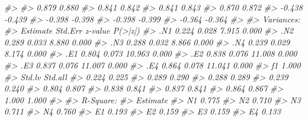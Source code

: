 \documentclass[
  11pt,
]{krantz}
\makeatletter
\newenvironment{Shaded}{\begin{snugshade}}{\end{snugshade}}
\newcommand{\CommentTok}[1]{\textcolor[rgb]{0.37,0.37,0.37}{\textit{#1}}}
\newenvironment{kframe}{%
\medskip{}
\setlength{\fboxsep}{.8em}
 \def\at@end@of@kframe{}%
 \ifinner\ifhmode%
  \def\at@end@of@kframe{\end{minipage}}%
  \begin{minipage}{\columnwidth}%
 \fi\fi%
 \def\FrameCommand##1{\hskip\@totalleftmargin \hskip-\fboxsep
 \colorbox{shadecolor}{##1}\hskip-\fboxsep
     \hskip-\linewidth \hskip-\@totalleftmargin \hskip\columnwidth}%
 \MakeFramed {\advance\hsize-\width
   \@totalleftmargin\z@ \linewidth\hsize
   \@setminipage}}%
 {\par\unskip\endMakeFramed%
 \at@end@of@kframe}
\renewenvironment{Shaded}{\begin{kframe}}{\end{kframe}}
\theoremstyle{definition}
\theoremstyle{definition}
\theoremstyle{definition}
\theoremstyle{definition}
\theoremstyle{remark}
\makeatother
\begin{document}
\begin{Shaded}
\begin{Highlighting}[]
\CommentTok{\#\textgreater{}                   }
\CommentTok{\#\textgreater{}     0.879    0.880}
\CommentTok{\#\textgreater{}     0.841    0.842}
\CommentTok{\#\textgreater{}     0.841    0.843}
\CommentTok{\#\textgreater{}     0.870    0.872}
\CommentTok{\#\textgreater{}    {-}0.438   {-}0.439}
\CommentTok{\#\textgreater{}    {-}0.398   {-}0.398}
\CommentTok{\#\textgreater{}    {-}0.398   {-}0.399}
\CommentTok{\#\textgreater{}    {-}0.364   {-}0.364}
\CommentTok{\#\textgreater{} }
\CommentTok{\#\textgreater{} Variances:}
\CommentTok{\#\textgreater{}                    Estimate  Std.Err  z{-}value  P(\textgreater{}|z|)}
\CommentTok{\#\textgreater{}    .N1                0.224    0.028    7.915    0.000}
\CommentTok{\#\textgreater{}    .N2                0.289    0.033    8.880    0.000}
\CommentTok{\#\textgreater{}    .N3                0.288    0.032    8.866    0.000}
\CommentTok{\#\textgreater{}    .N4                0.239    0.029    8.174    0.000}
\CommentTok{\#\textgreater{}    .E1                0.804    0.073   10.963    0.000}
\CommentTok{\#\textgreater{}    .E2                0.838    0.076   11.008    0.000}
\CommentTok{\#\textgreater{}    .E3                0.837    0.076   11.007    0.000}
\CommentTok{\#\textgreater{}    .E4                0.864    0.078   11.041    0.000}
\CommentTok{\#\textgreater{}     f1                1.000                           }
\CommentTok{\#\textgreater{}    Std.lv  Std.all}
\CommentTok{\#\textgreater{}     0.224    0.225}
\CommentTok{\#\textgreater{}     0.289    0.290}
\CommentTok{\#\textgreater{}     0.288    0.289}
\CommentTok{\#\textgreater{}     0.239    0.240}
\CommentTok{\#\textgreater{}     0.804    0.807}
\CommentTok{\#\textgreater{}     0.838    0.841}
\CommentTok{\#\textgreater{}     0.837    0.841}
\CommentTok{\#\textgreater{}     0.864    0.867}
\CommentTok{\#\textgreater{}     1.000    1.000}
\CommentTok{\#\textgreater{} }
\CommentTok{\#\textgreater{} R{-}Square:}
\CommentTok{\#\textgreater{}                    Estimate}
\CommentTok{\#\textgreater{}     N1                0.775}
\CommentTok{\#\textgreater{}     N2                0.710}
\CommentTok{\#\textgreater{}     N3                0.711}
\CommentTok{\#\textgreater{}     N4                0.760}
\CommentTok{\#\textgreater{}     E1                0.193}
\CommentTok{\#\textgreater{}     E2                0.159}
\CommentTok{\#\textgreater{}     E3                0.159}
\CommentTok{\#\textgreater{}     E4                0.133}
\end{Highlighting}
\end{Shaded}
\end{document}
